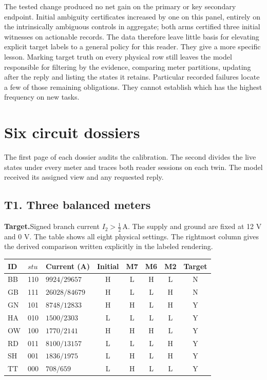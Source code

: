 \documentclass[12pt,letterpaper]{article}
\newcommand{\reading}[2]{\par\smallskip\textsf{\color{accent}\bfseries #1}\enspace #2\par}
\begin{document}
The tested change produced no net gain on the primary or key secondary endpoint. Initial ambiguity certificates increased by one on this panel, entirely on the intrinsically ambiguous controls in aggregate; both arms certified three initial witnesses on actionable records. The data therefore leave little basis for elevating explicit target labels to a general policy for this reader. They give a more specific lesson. Marking target truth on every physical row still leaves the model responsible for filtering by the evidence, comparing meter partitions, updating after the reply and listing the states it retains. Particular recorded failures locate a few of those remaining obligations. They cannot establish which has the highest frequency on new tasks.


\clearpage\section{Six circuit dossiers}The first page of each dossier audits the calibration. The second divides the live states under every meter and traces both reader sessions on each twin. The model received its assigned view and any requested reply.

\subsection*{T1. Three balanced meters}
\reading{Target.}{Signed branch current $I_{2}>\tfrac{1}{2}\,\mathrm{A}$. The supply and ground are fixed at 12 V and 0 V. The table shows all eight physical settings. The rightmost column gives the derived comparison written explicitly in the labeled rendering.}

\begin{center}{\small\setlength{\tabcolsep}{4pt}\begin{tabularx}{\linewidth}{@{}llYccccc@{}}\toprule
ID & $stu$ & Current (A) & Initial & M7 & M6 & M2 & Target\\ \midrule
BB & 110 & $9924/29657$ & H & L & H & L & N\\
GB & 111 & $26028/84679$ & H & L & L & H & N\\
GN & 101 & $8748/12833$ & H & H & L & H & Y\\
HA & 010 & $1500/2303$ & L & L & L & L & Y\\
OW & 100 & $1770/2141$ & H & H & H & L & Y\\
RD & 011 & $8100/13157$ & L & L & L & H & Y\\
SH & 001 & $1836/1975$ & L & H & L & H & Y\\
TT & 000 & $708/659$ & L & H & L & L & Y\\ \bottomrule\end{tabularx}}
\end{center}
\end{document}
